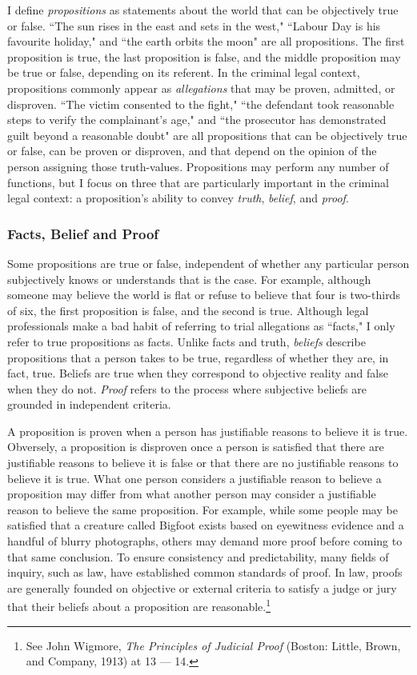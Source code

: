 I define \textit{propositions} as statements about the world that can be objectively true or false. ``The sun rises in the east and sets in the west," ``Labour Day is his favourite holiday," and ``the earth orbits the moon" are all propositions. The first proposition is true, the last proposition is false, and the middle proposition may be true or false, depending on its referent. In the criminal legal context, propositions commonly appear as \textit{allegations} that may be proven, admitted, or disproven. ``The victim consented to the fight," ``the defendant took reasonable steps to verify the complainant's age," and ``the prosecutor has demonstrated guilt beyond a reasonable doubt" are all propositions that can be objectively true or false, can be proven or disproven, and that depend on the opinion of the person assigning those truth-values. Propositions may perform any number of functions, but I focus on three that are particularly important in the criminal legal context: a proposition's ability to convey \textit{truth}, \textit{belief}, and \textit{proof}.

\subsubsection{Facts, Belief and Proof}

Some propositions are true or false, independent of whether any particular person subjectively knows or understands that is the case. For example, although someone may believe the world is flat or refuse to believe that four is two-thirds of six, the first proposition is false, and the second is true. Although legal professionals make a bad habit of referring to trial allegations as ``facts," I only refer to true propositions as facts. Unlike facts and truth, \textit{beliefs} describe propositions that a person takes to be true, regardless of whether they are, in fact, true. Beliefs are true when they correspond to objective reality and false when they do not. \textit{Proof} refers to the process where subjective beliefs are grounded in independent criteria. 

A proposition is proven when a person has justifiable reasons to believe it is true. Obversely, a proposition is disproven once a person is satisfied that there are justifiable reasons to believe it is false or that there are no justifiable reasons to believe it is true. What one person considers a justifiable reason to believe a proposition may differ from what another person may consider a justifiable reason to believe the same proposition. For example, while some people may be satisfied that a creature called Bigfoot exists based on eyewitness evidence and a handful of blurry photographs, others may demand more proof before coming to that same conclusion. To ensure consistency and predictability, many fields of inquiry, such as law, have established common standards of proof. In law, proofs are generally founded on objective or external criteria to satisfy a judge or jury that their beliefs about a proposition are reasonable.\footnote{See John Wigmore, \textit{The Principles of Judicial Proof} (Boston: Little, Brown, and Company, 1913) at 13 — 14.}

